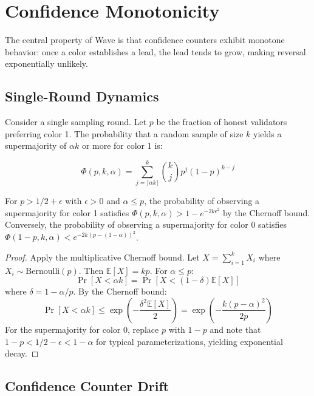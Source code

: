 \section{Confidence Monotonicity}

\label{sec:analysis}

The central property of Wave is that confidence counters exhibit monotone behavior:
once a color establishes a lead, the lead tends to grow, making reversal exponentially
unlikely.

\subsection{Single-Round Dynamics}

Consider a single sampling round. Let $p$ be the fraction of honest validators
preferring color 1. The probability that a random sample of size $k$ yields a
supermajority of $\alpha k$ or more for color 1 is:

\begin{equation}
\Phi(p, k, \alpha) = \sum_{j = \lceil \alpha k \rceil}^{k} \binom{k}{j} p^j (1-p)^{k-j}
\label{eq:supermajority}
\end{equation}

\begin{lemma}
\label{lem:amplification}
For $p > 1/2 + \epsilon$ with $\epsilon > 0$ and $\alpha \leq p$, the probability of
observing a supermajority for color 1 satisfies $\Phi(p, k, \alpha) > 1 - e^{-2k\epsilon^2}$
by the Chernoff bound. Conversely, the probability of observing a supermajority for
color 0 satisfies $\Phi(1-p, k, \alpha) < e^{-2k(p - (1-\alpha))^2}$.
\end{lemma}

\begin{proof}
Apply the multiplicative Chernoff bound. Let $X = \sum_{i=1}^{k} X_i$ where $X_i \sim \text{Bernoulli}(p)$.
Then $\mathbb{E}[X] = kp$. For $\alpha \leq p$:
\[
\Pr[X < \alpha k] = \Pr[X < (1 - \delta)\mathbb{E}[X]]
\]
where $\delta = 1 - \alpha/p$. By the Chernoff bound:
\[
\Pr[X < \alpha k] \leq \exp\left(-\frac{\delta^2 \mathbb{E}[X]}{2}\right) = \exp\left(-\frac{k(p - \alpha)^2}{2p}\right)
\]
For the supermajority for color 0, replace $p$ with $1-p$ and note that $1-p < 1/2 - \epsilon < 1-\alpha$
for typical parameterizations, yielding exponential decay.
\end{proof}

\subsection{Confidence Counter Drift}

